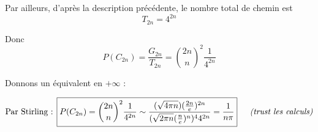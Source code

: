 Par ailleurs, d'après la description précédente, le nombre total de chemin est $$T_{2n}= 4^{2n}$$ 

Donc $$\boxed{P(C_{2n}) = \frac{G_{2n}}{T_{2n}} = \binom{2n}{n}^2 \frac{1}{4^{2n}}}$$

Donnons un équivalent en $+\infty$ : 

$$\begin{aligned}
\displaystyle \text{Par Stirling : } \boxed{P(C_{2n}) = \binom{2n}{n}^2 \frac{1}{4^{2n}} \sim \frac{(\sqrt{4\pi n})(\frac{2n}{e})^{2n}}{(\sqrt{2\pi n}(\frac{n}{e})^n)^44^{2n}}= \frac{1}{n\pi}} \hspace{15px} \textit{(trust les calculs)}
\end{aligned}$$